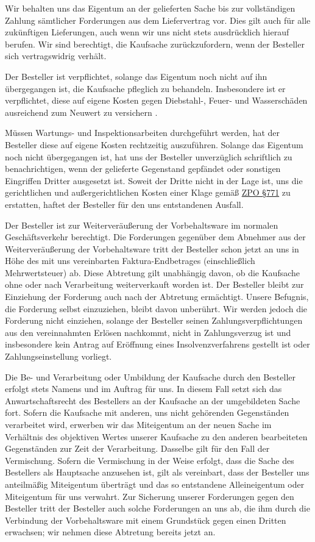 \documentclass[fontsize=12pt,parskip=half]{scrartcl}
\begin{document}
\begin{contract}
Wir behalten uns das Eigentum an der gelieferten Sache bis zur vollständigen Zahlung sämtlicher Forderungen aus dem Liefervertrag vor. Dies gilt auch für alle zukünftigen Lieferungen, auch wenn wir uns nicht stets ausdrücklich hierauf berufen. Wir sind berechtigt, die Kaufsache zurückzufordern, wenn der Besteller sich vertragswidrig verhält.

Der Besteller ist verpflichtet, solange das Eigentum noch nicht auf ihn übergegangen ist, die Kaufsache pfleglich zu behandeln. Insbesondere ist er verpflichtet, diese auf eigene Kosten gegen Diebstahl-, Feuer- und Wasserschäden ausreichend zum Neuwert zu versichern . 

Müssen Wartungs- und Inspektionsarbeiten durchgeführt werden, hat der Besteller diese auf eigene Kosten rechtzeitig auszuführen. Solange das Eigentum noch nicht übergegangen ist, hat uns der Besteller unverzüglich schriftlich zu benachrichtigen, wenn der gelieferte Gegenstand gepfändet oder sonstigen Eingriffen Dritter ausgesetzt ist. Soweit der Dritte nicht in der Lage ist, uns die gerichtlichen und außergerichtlichen Kosten einer Klage gemäß \href{https://www.gesetze-im-internet.de/zpo/__771.html}{ZPO §771} zu erstatten, haftet der Besteller für den uns entstandenen Ausfall.

Der Besteller ist zur Weiterveräußerung der Vorbehaltsware im normalen Geschäftsverkehr berechtigt. Die Forderungen gegenüber dem Abnehmer aus der Weiterveräußerung der Vorbehaltsware tritt der Besteller schon jetzt an uns in Höhe des mit uns vereinbarten Faktura-Endbetrages (einschließlich Mehrwertsteuer) ab. Diese Abtretung gilt unabhängig davon, ob die Kaufsache ohne oder nach Verarbeitung weiterverkauft worden ist. Der Besteller bleibt zur Einziehung der Forderung auch nach der Abtretung ermächtigt. Unsere Befugnis, die Forderung selbst einzuziehen, bleibt davon unberührt. Wir werden jedoch die Forderung nicht einziehen, solange der Besteller seinen Zahlungsverpflichtungen aus den vereinnahmten Erlösen nachkommt, nicht in Zahlungsverzug ist und insbesondere kein Antrag auf Eröffnung eines Insolvenzverfahrens gestellt ist oder Zahlungseinstellung vorliegt. 

Die Be- und Verarbeitung oder Umbildung der Kaufsache durch den Besteller erfolgt stets Namens und im Auftrag für uns. In diesem Fall setzt sich das Anwartschaftsrecht des Bestellers an der Kaufsache an der umgebildeten Sache fort. Sofern die Kaufsache mit anderen, uns nicht gehörenden Gegenständen verarbeitet wird, erwerben wir das Miteigentum an der neuen Sache im Verhältnis des objektiven Wertes unserer Kaufsache zu den anderen bearbeiteten Gegenständen zur Zeit der Verarbeitung. Dasselbe gilt für den Fall der Vermischung. Sofern die Vermischung in der Weise erfolgt, dass die Sache des Bestellers als Hauptsache anzusehen ist, gilt als vereinbart, dass der Besteller uns anteilmäßig Miteigentum überträgt und das so entstandene Alleineigentum oder Miteigentum für uns verwahrt. Zur Sicherung unserer Forderungen gegen den Besteller tritt der Besteller auch solche Forderungen an uns ab, die ihm durch die Verbindung der Vorbehaltsware mit einem Grundstück gegen einen Dritten erwachsen; wir nehmen diese Abtretung bereits jetzt an.


\end{contract}
\end{document}

